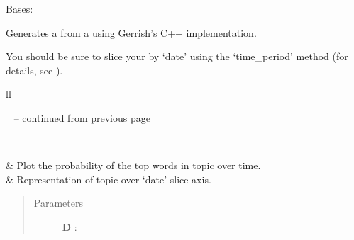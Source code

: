 \documentclass[letterpaper,10pt,english]{sphinxmanual}
\begin{document}
\begin{fulllineitems}
\label{tethne.model.managers.dtm:tethne.model.managers.dtm.DTMModelManager}
Bases: {\hyperref[tethne.model.managers:tethne.model.managers.ModelManager]{}}

Generates a {\hyperref[tethne.model.corpus.dtmmodel:tethne.model.corpus.dtmmodel.DTMModel]{}} from a {\hyperref[tethne.classes.corpus:tethne.classes.corpus.Corpus]{}} using 
\href{http://code.google.com/p/princeton-statistical-learning/downloads/detail?name=dtm\_release-0.8.tgz}{Gerrish's C++ implementation}.

You should be sure to slice your {\hyperref[tethne.classes.corpus:tethne.classes.corpus.Corpus]{}} by `date' using the 
`time\_period' method (for details, see {\hyperref[tethne.classes.corpus:tethne.classes.corpus.Corpus.slice]{}}).

\begin{longtable}{ll}
\hline
\endfirsthead

%
{{\textsf{\tablename\ \thetable{} -- continued from previous page}}} \\
\hline
\endhead

\hline {} \\ \hline
\endfoot

\endlastfoot


{\hyperref[tethne.model.managers.dtm:tethne.model.managers.dtm.DTMModelManager.plot_topic_evolution]{}}
 & 
Plot the probability of the top  words in topic  over time.
\\

{\hyperref[tethne.model.managers.dtm:tethne.model.managers.dtm.DTMModelManager.topic_over_time]{}}
 & 
Representation of topic  over `date' slice axis.
\\
\hline\end{longtable}

\begin{quote}\begin{description}
\item[{Parameters}] \leavevmode
\textbf{D} : {\hyperref[tethne.classes.corpus:tethne.classes.corpus.Corpus]{}}


\end{description}
\end{quote}
\end{fulllineitems}
\end{document}
